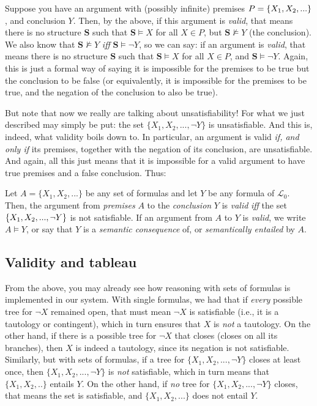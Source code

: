 Suppose you have an argument with (possibly infinite) premises $P=\{X_1, X_2, ...\}$, and conclusion $Y$. Then, by the above, if this argument is \textit{valid}, that means there is no structure $\mathbf{S}$ such that $\mathbf{S} \models X$ for all $X \in P$, but $\mathbf{S} \not\models Y$ (the conclusion). We also know that $\mathbf{S} \not\models Y$ \textit{iff} $\mathbf{S} \models \neg Y$, so we can say: if an argument is \textit{valid}, that means there is no structure $\mathbf{S}$ such that $\mathbf{S} \models X$ for all $X \in P$, and $\mathbf{S} \models \neg Y$. Again, this is just a formal way of saying it is impossible for the premises to be true but the conclusion to be false (or equivalently, it is impossible for the premises to be true, and the negation of the conclusion to also be true). 

But note that now we really are talking about unsatisfiability! For what we just described may simply be put: the set $\{X_1, X_2, ..., \neg Y\}$ is unsatisfiable. And this is, indeed, what validity boils down to. In particular, an argument is valid \textit{if, and only if} its premises, together with the negation of its conclusion, are unsatisfiable. And again, all this just means that it is impossible for a valid argument to have true premises and a false conclusion. Thus:

\begin{defn}[Validity]
Let $A=\{X_1, X_2, ...\}$ be any set of formulas and let $Y$ be any formula of $\mathcal{L}_0$. Then, the argument from \textit{premises} $A$ to the \textit{conclusion} $Y$ is \textit{valid} \textit{iff} the set $\{X_1, X_2, ..., \neg Y\}$ is not satisfiable. If an argument from $A$ to $Y$ is \textit{valid}, we write $A \models Y$, or say that $Y$ is a \textit{semantic consequence} of, or \textit{semantically entailed} by $A$.  
\end{defn}

\subsection{Validity and tableau}

From the above, you may already see how reasoning with sets of formulas is implemented in our system. With single formulas, we had that if \textit{every} possible tree for $\neg X$ remained open, that must mean $\neg X$ is satisfiable (i.e., it is a tautology or contingent), which in turn ensures that $X$ is \textit{not} a tautology. On the other hand, if there is a possible tree for $\neg X$ that closes (closes on all its branches), then $X$ is indeed a tautology, since its negation is not satisfiable. Similarly, but with sets of formulas, if a tree for $\{X_1, X_2, ..., \neg Y\}$ closes at least once, then $\{X_1, X_2, ..., \neg Y\}$ is \textit{not} satisfiable, which in turn means that $\{X_1, X_2, ..\}$ entails $Y$. On the other hand, if \textit{no} tree for $\{X_1, X_2, ..., \neg Y\}$ closes, that means the set is satisfiable, and $\{X_1, X_2, ...\}$ does not entail $Y$. 

